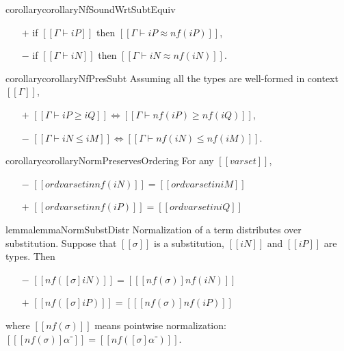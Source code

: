 \begin{restatable}{corollary}{corollaryNfSoundWrtSubtEquiv}
    \label{corollary:nf-sound-wrt-subt-equiv}
    \hfill
    \begin{itemize}
        \item [$+$] if $[[Γ ⊢ iP]]$ then $[[Γ ⊢ iP ≈ nf(iP)]]$,
        \item [$-$] if $[[Γ ⊢ iN]]$ then $[[Γ ⊢ iN ≈ nf(iN)]]$.
    \end{itemize}
\end{restatable}


\begin{restatable}{corollary}{corollaryNfPresSubt}
    \label{corollary:nf-pres-subt}
    Assuming all the types are well-formed in context $[[Γ]]$,
    \begin{itemize}
        \item [$+$] $[[Γ ⊢ iP ≥ iQ]] \iff [[Γ ⊢ nf(iP) ≥ nf(iQ)]]$,
        \item [$-$] $[[Γ ⊢ iN ≤ iM]] \iff [[Γ ⊢ nf(iN) ≤ nf(iM)]]$.
    \end{itemize}
\end{restatable}



\begin{restatable}{corollary}{corollaryNormPreservesOrdering}
    \label{corollary:normalization-ord}
    For any $[[varset]]$,
    \begin{itemize}
    \item[$-$] $[[ord varset in nf(iN)]] = [[ord varset in iM]]$
    \item[$+$] $[[ord varset in nf(iP)]] = [[ord varset in iQ]]$
    \end{itemize}
\end{restatable}


\begin{restatable}{lemma}{lemmaNormSubstDistr}
    \label{lemma:norm-subst-distr} 
    Normalization of a term distributes over substitution.
    Suppose that $[[σ]]$ is a substitution, $[[iN]]$ and $[[iP]]$ are types. Then
        \begin{itemize}
            \item[$-$] $[[nf([σ]iN)]] = [[ [nf(σ)] nf(iN) ]]$
            \item[$+$] $[[nf([σ]iP)]] = [[ [nf(σ)] nf(iP) ]]$
    \end{itemize}
    where $[[nf(σ)]]$ means pointwise normalization: $[[ [nf(σ)] α⁻]] = [[nf([σ]α⁻)]]$.
\end{restatable}

